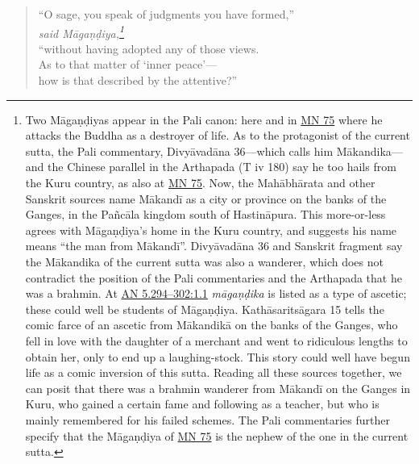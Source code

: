 \documentclass[12pt,openany]{book}%
\newcommand*{\scspeaker}[1]{\hspace{2em}\textit{#1}}
\begin{document}
\begin{verse}
“O sage, you speak of judgments you have formed,” \\
\scspeaker{said \textsanskrit{Māgaṇḍiya},\footnote{Two \textsanskrit{Māgaṇḍiyas} appear in the Pali canon: here and in \href{https://suttacentral.net/mn75/en/sujato}{MN 75} where he attacks the Buddha as a destroyer of life. As to the protagonist of the current sutta, the Pali commentary, \textsanskrit{Divyāvadāna} 36—which calls him \textsanskrit{Mākandika}—and the Chinese parallel in the Arthapada (T iv 180) say he too hails from the Kuru country, as also at \href{https://suttacentral.net/mn75/en/sujato}{MN 75}. Now, the \textsanskrit{Mahābhārata} and other Sanskrit sources name \textsanskrit{Mākandī} as a city or province on the banks of the Ganges, in the \textsanskrit{Pañcāla} kingdom south of \textsanskrit{Hastināpura}. This more-or-less agrees with \textsanskrit{Māgaṇḍiya}’s home in the Kuru country, and suggests his name means “the man from \textsanskrit{Mākandī}”. \textsanskrit{Divyāvadāna} 36 and Sanskrit fragment say the \textsanskrit{Mākandika} of the current sutta was also a wanderer, which does not contradict the position of the Pali commentaries and the Arthapada that he was a brahmin. At \href{https://suttacentral.net/an5.294-302/en/sujato\#1.1}{AN 5.294–302:1.1} \textit{\textsanskrit{māgaṇḍika}} is listed as a type of ascetic; these could well be students of \textsanskrit{Māgaṇḍiya}. \textsanskrit{Kathāsaritsāgara} 15 tells the comic farce of an ascetic from \textsanskrit{Mākandikā} on the banks of the Ganges, who fell in love with the daughter of a merchant and went to ridiculous lengths to obtain her, only to end up a laughing-stock. This story could well have begun life as a comic inversion of this sutta. Reading all these sources together, we can posit that there was a brahmin wanderer from \textsanskrit{Mākandī} on the Ganges in Kuru, who gained a certain fame and following as a teacher, but who is mainly remembered for his failed schemes. The Pali commentaries further specify that the \textsanskrit{Māgaṇḍiya} of \href{https://suttacentral.net/mn75/en/sujato}{MN 75} is the nephew of the one in the current sutta. } }\\
“without having adopted any of those views. \\
As to that matter of ‘inner peace’—\\
how is that described by the attentive?” 


\end{verse}
\end{document}
